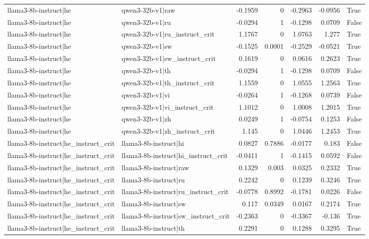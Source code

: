 \begin{table}
\begin{tabular}{l l r r r r l}
llama3-8b-instruct|he & qwen3-32b-v1|raw & -0.1959 & 0 & -0.2963 & -0.0956 & True \\
llama3-8b-instruct|he & qwen3-32b-v1|ru & -0.0294 & 1 & -0.1298 & 0.0709 & False \\
llama3-8b-instruct|he & qwen3-32b-v1|ru_instruct_crit & 1.1767 & 0 & 1.0763 & 1.277 & True \\
llama3-8b-instruct|he & qwen3-32b-v1|sw & -0.1525 & 0.0001 & -0.2529 & -0.0521 & True \\
llama3-8b-instruct|he & qwen3-32b-v1|sw_instruct_crit & 0.1619 & 0 & 0.0616 & 0.2623 & True \\
llama3-8b-instruct|he & qwen3-32b-v1|th & -0.0294 & 1 & -0.1298 & 0.0709 & False \\
llama3-8b-instruct|he & qwen3-32b-v1|th_instruct_crit & 1.1559 & 0 & 1.0555 & 1.2563 & True \\
llama3-8b-instruct|he & qwen3-32b-v1|vi & -0.0264 & 1 & -0.1268 & 0.0739 & False \\
llama3-8b-instruct|he & qwen3-32b-v1|vi_instruct_crit & 1.1012 & 0 & 1.0008 & 1.2015 & True \\
llama3-8b-instruct|he & qwen3-32b-v1|zh & 0.0249 & 1 & -0.0754 & 0.1253 & False \\
llama3-8b-instruct|he & qwen3-32b-v1|zh_instruct_crit & 1.145 & 0 & 1.0446 & 1.2453 & True \\
llama3-8b-instruct|he_instruct_crit & llama3-8b-instruct|hi & 0.0827 & 0.7886 & -0.0177 & 0.183 & False \\
llama3-8b-instruct|he_instruct_crit & llama3-8b-instruct|hi_instruct_crit & -0.0411 & 1 & -0.1415 & 0.0592 & False \\
llama3-8b-instruct|he_instruct_crit & llama3-8b-instruct|raw & 0.1329 & 0.003 & 0.0325 & 0.2332 & True \\
llama3-8b-instruct|he_instruct_crit & llama3-8b-instruct|ru & 0.2242 & 0 & 0.1239 & 0.3246 & True \\
llama3-8b-instruct|he_instruct_crit & llama3-8b-instruct|ru_instruct_crit & -0.0778 & 0.8992 & -0.1781 & 0.0226 & False \\
llama3-8b-instruct|he_instruct_crit & llama3-8b-instruct|sw & 0.117 & 0.0349 & 0.0167 & 0.2174 & True \\
llama3-8b-instruct|he_instruct_crit & llama3-8b-instruct|sw_instruct_crit & -0.2363 & 0 & -0.3367 & -0.136 & True \\
llama3-8b-instruct|he_instruct_crit & llama3-8b-instruct|th & 0.2291 & 0 & 0.1288 & 0.3295 & True \\

\end{tabular}
\end{table}
